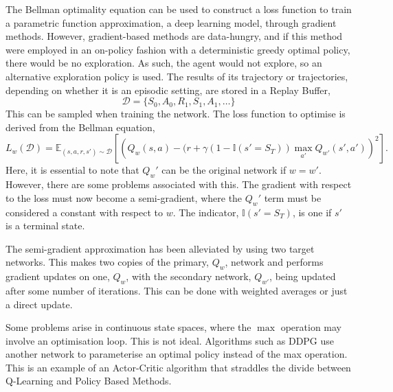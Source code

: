 The Bellman optimality equation can be used to construct a loss function to train a parametric function approximation, a deep learning model, through gradient methods. However, gradient-based methods are data-hungry, and if this method were employed in an on-policy fashion with a deterministic greedy optimal policy, there would be no exploration. As such, the agent would not explore, so an alternative exploration policy is used. The results of its trajectory or trajectories, depending on whether it is an episodic setting, are stored in a Replay Buffer,
\begin{equation}
	\mathcal{D} = \{S_0, A_0, R_1, S_1, A_1, \ldots \}
\end{equation}
This can be sampled when training the network. The loss function to optimise is derived from the Bellman equation,
\begin{equation}
	L_{w}(\mathcal{D}) = \mathbb{E}_{(s,a,r,s') \sim \mathcal{D}}\left[\left(Q_w(s,a) -(r + \gamma(1-\mathbb{I}(s'= S_{T}))\max_{a'}Q_{w'}(s', a')\right)^2\right].
\end{equation}
Here, it is essential to note that $Q_w'$ can be the original network if $w = w'$. However, there are some problems associated with this. The gradient with respect to the loss must now become a semi-gradient, where the $Q_w'$ term must be considered a constant with respect to $w$. The indicator, $\mathbb{I}(s' = S_T)$,  is one if $s'$ is a terminal state.

The semi-gradient approximation has been alleviated by using two target networks\cite{minh2016asynchronous}. This makes two copies of the primary, $Q_w$, network and performs gradient updates on one, $Q_w$, with the secondary network, $Q_{w'}$, being updated after some number of iterations. This can be done with weighted averages or just a direct update.

Some problems arise in continuous state spaces, where the $\max$ operation may involve an optimisation loop. This is not ideal. Algorithms such as DDPG\cite{lillicrap2015continuous} use another network to parameterise an optimal policy instead of the max operation. This is an example of an Actor-Critic algorithm that straddles the divide between Q-Learning and Policy Based Methods.
